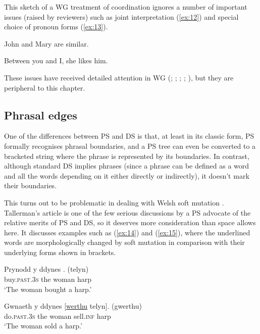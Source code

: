 \documentclass[output=paper
	        ,collection
	        ,collectionchapter
 	        ,biblatex
                ,babelshorthands
                ,newtxmath
                ,draftmode
                ,colorlinks, citecolor=brown
]{langscibook}
\begin{document}
This sketch of a WG treatment of coordination ignores a number of important issues (raised by reviewers) such as joint interpretation (\ref{ex:12}) and special choice of pronoun forms (\ref{ex:13}).

\begin{exe}
	\ex \label{ex:12} John and Mary are similar.

	\ex \label{ex:13} Between you and I, she likes him.
\end{exe}

These issues have received detailed attention in WG (\citealt[Chapter~5]{Hudson84a-u}; \citeyear{Hudson88a}; \citeyear[Chapter~14]{Hudson90a-u}; \citeyear{Hudson1995}; \citeyear[175--181, 304--307]{Hudson2010b-u}), but they are peripheral to this chapter.


\subsection{Phrasal edges}
\label{sec:4.3}

One of the differences between PS and DS is that, at least in its classic form, PS formally recognises phrasal boundaries, and a PS tree can even be converted to a bracketed string where the phrase is represented by its boundaries. In contrast, although standard DS implies phrases (since a phrase can be defined as a word and all the words depending on it either directly or indirectly), it doesn’t mark their boundaries.

This turns out to be problematic in dealing with Welsh soft mutation \citep{Tallerman2009}. Tallerman’s article is one of the few serious discussions by a PS advocate of the relative merits of PS and DS, so it deserves more consideration than space allows here. It discusses examples such as (\ref{ex:14}) and (\ref{ex:15}), where the underlined words are morphologically changed by soft mutation in comparison with their underlying forms shown in brackets.

\begin{exe}
	\ex \label{ex:14}
	\gll Prynodd y ddynes \underline{}. (telyn)\\
	buy.\textsc{past}.3\textsc{s} the woman harp\\
	\glt ‘The woman bought a harp.’

	\ex \label{ex:15}
	\gll Gwnaeth y ddynes [\underline{werthu} telyn]. (gwerthu)\\
	do.\textsc{past}.3\textsc{s} the woman sell.\textsc{inf} harp\\
	\glt ‘The woman sold a harp.’
\end{exe}
\end{document}
